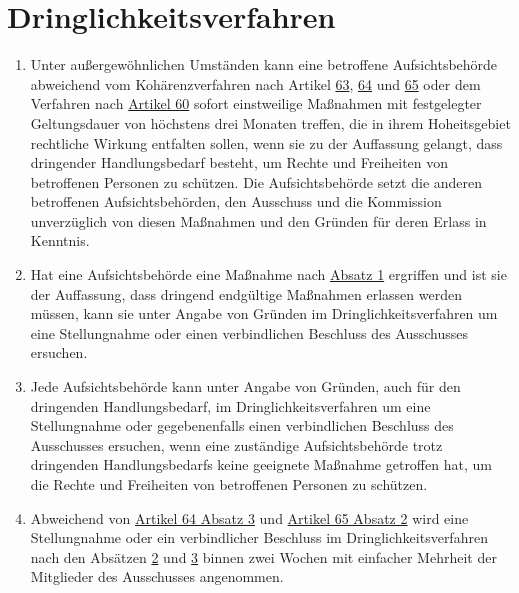 \chapter{Dringlichkeitsverfahren}
\label{ch:66}


\begin{enumerate}

  \item Unter außergewöhnlichen Umständen kann eine betroffene Aufsichtsbehörde abweichend vom Kohärenzverfahren nach
   Artikel \hyperref[ch:63]{63}, \hyperref[ch:64]{64} und \hyperref[ch:65]{65} oder dem Verfahren nach \hyperref[ch:60]
   {Artikel 60} sofort einstweilige Maßnahmen mit festgelegter Geltungsdauer von höchstens drei Monaten treffen, die in
   ihrem Hoheitsgebiet rechtliche Wirkung entfalten sollen, wenn sie zu der Auffassung gelangt, dass dringender
   Handlungsbedarf besteht, um Rechte und Freiheiten von betroffenen Personen zu schützen. Die Aufsichtsbehörde setzt
   die anderen betroffenen Aufsichtsbehörden, den Ausschuss und die Kommission unverzüglich von diesen Maßnahmen und
   den Gründen für deren Erlass in Kenntnis.
  \label{itm:66-1}

  \item Hat eine Aufsichtsbehörde eine Maßnahme nach \hyperref[itm:66-1]{Absatz 1} ergriffen und ist sie der Auffassung,
   dass dringend endgültige Maßnahmen erlassen werden müssen, kann sie unter Angabe von Gründen im
   Dringlichkeitsverfahren um eine Stellungnahme oder einen verbindlichen Beschluss des Ausschusses ersuchen.
  \label{itm:66-2}

  \item Jede Aufsichtsbehörde kann unter Angabe von Gründen, auch für den dringenden Handlungsbedarf, im
   Dringlichkeitsverfahren um eine Stellungnahme oder gegebenenfalls einen verbindlichen Beschluss des Ausschusses
   ersuchen, wenn eine zuständige Aufsichtsbehörde trotz dringenden Handlungsbedarfs keine geeignete Maßnahme getroffen
   hat, um die Rechte und Freiheiten von betroffenen Personen zu schützen.
  \label{itm:66-3}

  \item Abweichend von \hyperref[itm:64-3]{Artikel 64 Absatz 3} und \hyperref[itm:65-2]{Artikel 65 Absatz 2} wird eine
   Stellungnahme oder ein verbindlicher Beschluss im Dringlichkeitsverfahren nach den Absätzen \hyperref[itm:66-2]
   {2} und \hyperref[itm:66-3]{3} binnen zwei Wochen mit einfacher Mehrheit der Mitglieder des Ausschusses angenommen.
  \label{itm:66-4}

\end{enumerate}


